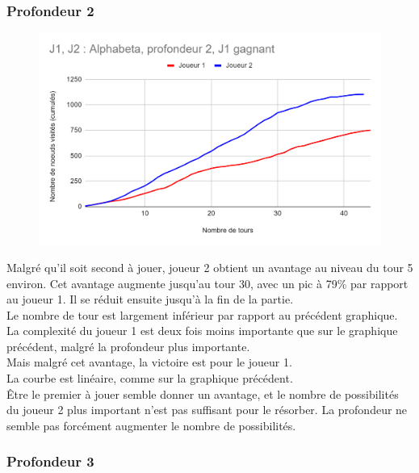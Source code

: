 \documentclass[12pt]{article}
\begin{document}
\subsubsection{Profondeur 2}

\begin{figure}[!h]
   \includegraphics[width=\textwidth]{prof2alphabeta.png}
\end{figure}

Malgré qu’il soit second à jouer, joueur 2 obtient un avantage au niveau du tour 5 environ. Cet avantage augmente jusqu’au tour 30, avec un pic à 79\% par rapport au joueur 1. Il se réduit ensuite jusqu’à la fin de la partie.\\
Le nombre de tour est largement inférieur par rapport au précédent graphique. La complexité du joueur 1 est deux fois moins importante que sur le graphique précédent, malgré la profondeur plus importante.\\
Mais malgré cet avantage, la victoire est pour le joueur 1.\\

La courbe est linéaire, comme sur la graphique précédent.\\
Être le premier à jouer semble donner un avantage, et le nombre de possibilités du joueur 2 plus important n’est pas suffisant pour le résorber. La profondeur ne semble pas forcément augmenter le nombre de possibilités.
\newpage
\subsubsection{Profondeur 3}
\end{document}
